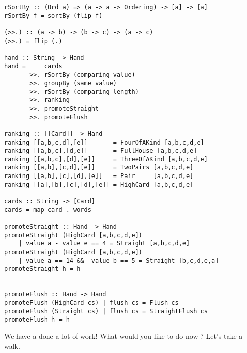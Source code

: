 \lhN
\hspace*{\fill} 
\lhA
\begin{lstlisting}[frame=single]
rSortBy :: (Ord a) => (a -> a -> Ordering) -> [a] -> [a]
rSortBy f = sortBy (flip f)

(>>.) :: (a -> b) -> (b -> c) -> (a -> c)
(>>.) = flip (.)

hand :: String -> Hand
hand =     cards
       >>. rSortBy (comparing value)
       >>. groupBy (same value)
       >>. rSortBy (comparing length)
       >>. ranking 
       >>. promoteStraight
       >>. promoteFlush    

ranking :: [[Card]] -> Hand
ranking [[a,b,c,d],[e]]       = FourOfAKind [a,b,c,d,e]
ranking [[a,b,c],[d,e]]       = FullHouse [a,b,c,d,e]
ranking [[a,b,c],[d],[e]]     = ThreeOfAKind [a,b,c,d,e]
ranking [[a,b],[c,d],[e]]     = TwoPairs [a,b,c,d,e]
ranking [[a,b],[c],[d],[e]]   = Pair     [a,b,c,d,e]
ranking [[a],[b],[c],[d],[e]] = HighCard [a,b,c,d,e] 

cards :: String -> [Card]
cards = map card . words 

promoteStraight :: Hand -> Hand
promoteStraight (HighCard [a,b,c,d,e]) 
    | value a - value e == 4 = Straight [a,b,c,d,e]
promoteStraight (HighCard [a,b,c,d,e]) 
    | value a == 14 &&  value b == 5 = Straight [b,c,d,e,a]
promoteStraight h = h


promoteFlush :: Hand -> Hand
promoteFlush (HighCard cs) | flush cs = Flush cs
promoteFlush (Straight cs) | flush cs = StraightFlush cs
promoteFlush h = h
\end{lstlisting}
\lhN We have a done a lot of work! What would you like to do now ?
\lhA Let's take a walk.
\lhend

